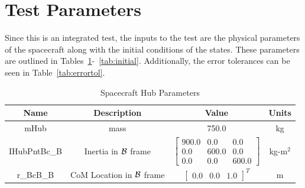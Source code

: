 \section{Test Parameters}

Since this is an integrated test, the inputs to the test are the physical parameters of the spacecraft along with the initial conditions of the states. These parameters are outlined in Tables~\ref{tab:hub}-~\ref{tab:initial}. Additionally, the error tolerances can be seen in Table~\ref{tab:errortol}.

\begin{table}[htbp]
	\caption{Spacecraft Hub Parameters}
	\label{tab:hub}
	\centering \fontsize{10}{10}\selectfont
	\begin{tabular}{| c | c | c | c |} %
		\hline
		\textbf{Name}  & \textbf{Description}  & \textbf{Value} & \textbf{Units} \\
		\hline
		mHub  & mass & 750.0 & kg \\
		\hline
		IHubPntBc\_B & Inertia in $\cal{B}$ frame & $\begin{bmatrix}
		900.0 & 0.0 & 0.0\\
		0.0 & 600.0 & 0.0\\
		0.0 & 0.0 & 600.0
		\end{bmatrix}$ & kg-m$^2$ \\
		\hline
		r\_BcB\_B & CoM Location in $\cal{B}$ frame & $\begin{bmatrix}
		0.0 & 0.0 & 1.0 \end{bmatrix}^T$ & m \\
		\hline
	\end{tabular}
\end{table}

